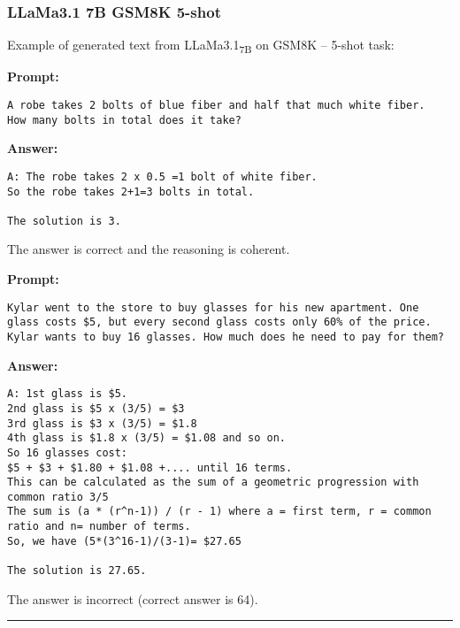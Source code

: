 \subsubsection*{LLaMa3.1 7B GSM8K 5-shot}
\noindent Example of generated text from LLaMa3.1\textsubscript{7B} on GSM8K -- 5-shot task:
\begin{displayquote}
	\textbf{Prompt:}
	\begin{Verbatim}[fontsize=\small,breaklines]
A robe takes 2 bolts of blue fiber and half that much white fiber.  How many bolts in total does it take?
	\end{Verbatim}
	\textbf{Answer:}
	\begin{Verbatim}[fontsize=\small,breaklines]
A: The robe takes 2 x 0.5 =1 bolt of white fiber.
So the robe takes 2+1=3 bolts in total.

The solution is 3.
	\end{Verbatim}
\end{displayquote}
The answer is correct and the reasoning is coherent.
\begin{displayquote}
	\textbf{Prompt:}
	\begin{Verbatim}[fontsize=\small,breaklines]
Kylar went to the store to buy glasses for his new apartment. One glass costs $5, but every second glass costs only 60% of the price. Kylar wants to buy 16 glasses. How much does he need to pay for them?
	\end{Verbatim}
	\textbf{Answer:}
	\begin{Verbatim}[fontsize=\small,breaklines]
A: 1st glass is $5.
2nd glass is $5 x (3/5) = $3
3rd glass is $3 x (3/5) = $1.8
4th glass is $1.8 x (3/5) = $1.08 and so on.
So 16 glasses cost:
$5 + $3 + $1.80 + $1.08 +.... until 16 terms.
This can be calculated as the sum of a geometric progression with common ratio 3/5
The sum is (a * (r^n-1)) / (r - 1) where a = first term, r = common ratio and n= number of terms.
So, we have (5*(3^16-1)/(3-1)= $27.65

The solution is 27.65.
	\end{Verbatim}
\end{displayquote}
The answer is incorrect (correct answer is 64).

\noindent\rule{\textwidth}{0.4pt}

